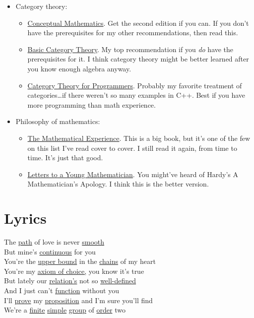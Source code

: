 \documentclass[11pt,paper=letter]{scrartcl}
\makeatletter
\newcommand\@wo[2][]{\hyperref[w:#1]{#2}}
\newcommand\wo{\@dblarg\@wo}
\makeatother
\begin{document}
\begin{itemize}
\begin{itemize}
\end{itemize}
\item Category theory:
\begin{itemize}
  \item \href{https://s3.amazonaws.com/arena-attachments/325201/2ff932bf546d8985eb613fccf02b69c7.pdf}{Conceptual Mathematics}. Get the second edition if you can. If you don't have the prerequisites for my other recommendations, then read this.
  \item \href{https://arxiv.org/abs/1612.09375}{Basic Category Theory}. My top recommendation if you \textit{do} have the prerequisites for it. I think category theory might be better learned after you know enough algebra anyway.
  \item \href{https://github.com/hmemcpy/milewski-ctfp-pdf/}{Category Theory for Programmers}. Probably my favorite treatment of categories\dots if there weren't so many examples in C++. Best if you have more programming than math experience.
\end{itemize}
\item Philosophy of mathematics:
\begin{itemize}
  \item \href{https://en.wikipedia.org/wiki/The_Mathematical_Experience}{The Mathematical Experience}. This is a big book, but it's one of the few on this list I've read cover to cover. I still read it again, from time to time. It's just that good.
  \item \href{https://en.wikipedia.org/wiki/Letters_to_a_Young_Mathematician}{Letters to a Young Mathematician}. You might've heard of Hardy's A Mathematician's Apology. I think this is the better version.
\end{itemize}
\end{itemize}

\section{Lyrics}

\noindent
The \wo{path} of love is never \wo{smooth} \\
But mine's \wo{continuous} for you \\
You're the \wo{upper bound} in the \wo[chain]{chains} of my heart \\
You're my \wo[axiom of choice]{axiom of choice,} you know it's true \\

\noindent
But lately our \wo[relation]{relation's} not so \wo{well-defined} \\
And I just can't \wo{function} without you \\
I'll \wo[proof]{prove} my \wo{proposition} and I'm sure you'll find \\
We're a \wo{finite} \wo[simple group]{simple} \wo{group} of \wo{order} two \\
\end{document}
